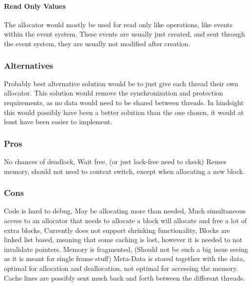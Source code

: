 \paragraph{Read Only Values}
The allocator would mostly be used for read only like operations, like events within the event system.
These events are usually just created, and sent through the event system, they are usually not modified after creation.

\subsubsection{Alternatives}
Probably best alternative solution would be to just give each thread their own allocator.
This solution would remove the synchronization and protection requirements, as no data would need to be shared between threads.
In hindsight this would possibly have been a better solution than the one chosen, it would at least have been easier to implement.

\subsubsection{Pros}
No chances of deadlock,
Wait free, (or just lock-free need to check)
Reuses memory,
should not need to context switch, except when allocating a new block.

\subsubsection{Cons}
Code is hard to debug,
May be allocating more than needed,
Much simultaneous access to an allocator that needs to allocate a block will
allocate and free a lot of extra blocks,
Currently does not support shrinking functionality,
Blocks are linked list based, meaning that some caching is lost,
however it is needed to not invalidate pointers.
Memory is fragmented, (Should not be such a big issue seeing as it is meant for single frame stuff)
Meta-Data is stored together with the data, optimal for allocation and deallocation,
not optimal for accessing the memory.
Cache lines are possibly sent much back and forth between the different threads.
